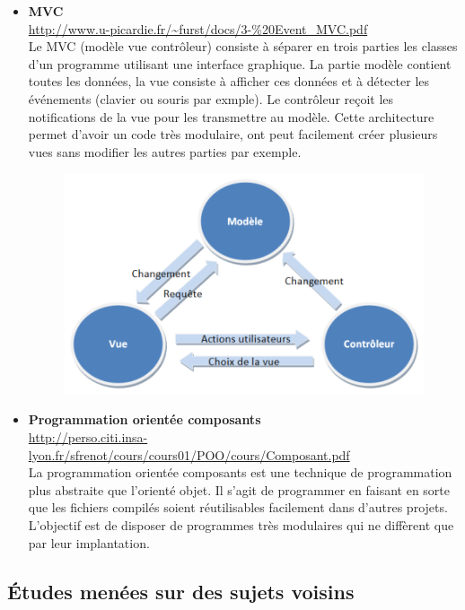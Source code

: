 \documentclass[11pt]{report}
\begin{document}
\begin{itemize}
				  \item \textbf{MVC}\\
				  	\url{http://www.u-picardie.fr/~furst/docs/3-%20Event_MVC.pdf}\\
		      		Le MVC (modèle vue contrôleur) consiste à séparer en trois parties les classes d’un programme utilisant une interface graphique. La partie modèle contient toutes les données, la vue consiste à afficher ces données et à détecter les événements (clavier ou souris par exmple). Le contrôleur reçoit les notifications de la vue pour les transmettre au modèle. Cette architecture permet d’avoir un code très modulaire, ont peut facilement créer plusieurs vues sans modifier les autres parties par exemple.
				  	\begin{figure}[h]
		      			\begin{center}
					  		\includegraphics[scale=0.8]{mvc.png}
		      			\end{center}
				  	\end{figure}
				  \item \textbf{Programmation orientée composants}\\
				  	\url{http://perso.citi.insa-lyon.fr/sfrenot/cours/cours01/POO/cours/Composant.pdf}\\
				  	La programmation orientée composants est une technique de programmation plus abstraite que l’orienté objet. Il s’agit de programmer en faisant en sorte que les fichiers compilés soient réutilisables facilement dans d’autres projets. L’objectif est de disposer de programmes très modulaires qui ne diffèrent que par leur implantation.
				\end{itemize}
				
			\subsection{Études menées sur des sujets voisins}
			
\end{document}
